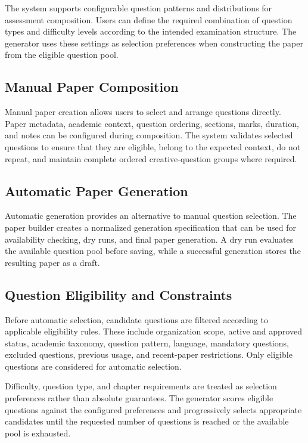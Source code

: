 The system supports configurable question patterns and distributions for assessment composition. Users can define the required combination of question types and difficulty levels according to the intended examination structure. The generator uses these settings as selection preferences when constructing the paper from the eligible question pool.

\subsection{Manual Paper Composition}

Manual paper creation allows users to select and arrange questions directly. Paper metadata, academic context, question ordering, sections, marks, duration, and notes can be configured during composition. The system validates selected questions to ensure that they are eligible, belong to the expected context, do not repeat, and maintain complete ordered creative-question groups where required.

\subsection{Automatic Paper Generation}

Automatic generation provides an alternative to manual question selection. The paper builder creates a normalized generation specification that can be used for availability checking, dry runs, and final paper generation. A dry run evaluates the available question pool before saving, while a successful generation stores the resulting paper as a draft.

\subsection{Question Eligibility and Constraints}

Before automatic selection, candidate questions are filtered according to applicable eligibility rules. These include organization scope, active and approved status, academic taxonomy, question pattern, language, mandatory questions, excluded questions, previous usage, and recent-paper restrictions. Only eligible questions are considered for automatic selection.

Difficulty, question type, and chapter requirements are treated as selection preferences rather than absolute guarantees. The generator scores eligible questions against the configured preferences and progressively selects appropriate candidates until the requested number of questions is reached or the available pool is exhausted.

